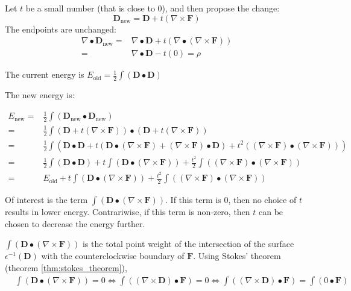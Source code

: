 Let \(t\) be a small number (that is close to 0), and then propose the change:
\[\mathbf{D}_{\text{new}} = \mathbf{D} + t(\nabla \times \mathbf{F})\]
The endpoints are unchanged:
\begin{align*}
\nabla \bullet \mathbf{D}_{\text{new}} = & \nabla \bullet \mathbf{D} + t(\nabla \bullet (\nabla \times \mathbf{F})) \\ 
= & \nabla \bullet \mathbf{D} - t(0) 
= \rho
\end{align*}

The current energy is \(E_{\text{old}} = \frac{1}{2}\int (\mathbf{D} \bullet \mathbf{D})\)

The new energy is: 

\begin{align*}
E_{\text{new}} = & \frac{1}{2}\int (\mathbf{D}_{\text{new}} \bullet \mathbf{D}_{\text{new}}) \\ 
= & \frac{1}{2}\int (\mathbf{D} + t (\nabla \times \mathbf{F})) \bullet (\mathbf{D} + t (\nabla \times \mathbf{F})) \\ 
= & \frac{1}{2}\int (\mathbf{D} \bullet \mathbf{D} + t(\mathbf{D} \bullet (\nabla \times \mathbf{F}) + (\nabla \times \mathbf{F}) \bullet \mathbf{D}) + t^2((\nabla \times \mathbf{F}) \bullet (\nabla \times \mathbf{F}))) \\
= & \frac{1}{2}\int (\mathbf{D} \bullet \mathbf{D}) + t\int (\mathbf{D} \bullet (\nabla \times \mathbf{F})) + \frac{t^2}{2}\int ((\nabla \times \mathbf{F}) \bullet (\nabla \times \mathbf{F})) \\ 
= & E_{\text{old}} + t\int (\mathbf{D} \bullet (\nabla \times \mathbf{F})) + \frac{t^2}{2}\int ((\nabla \times \mathbf{F}) \bullet (\nabla \times \mathbf{F}))
\end{align*}

Of interest is the term \(\int (\mathbf{D} \bullet (\nabla \times \mathbf{F}))\). If this term is \(0\), then no choice of \(t\) results in lower energy. Contrariwise, if this term is non-zero, then \(t\) can be chosen to decrease the energy further. 

\(\int (\mathbf{D} \bullet (\nabla \times \mathbf{F}))\) is the total point weight of the intersection of the surface \(\epsilon^{-1}(\mathbf{D})\) with the counterclockwise boundary of \(\mathbf{F}\). Using Stokes' theorem (theorem \ref{thm:stokes_theorem}), 
\begin{align*}
& \int (\mathbf{D} \bullet (\nabla \times \mathbf{F})) = 0
\iff \int ((\nabla \times \mathbf{D}) \bullet \mathbf{F}) = 0 
\iff \int ((\nabla \times \mathbf{D}) \bullet \mathbf{F}) = \int (0 \bullet \mathbf{F}) 
\end{align*}

